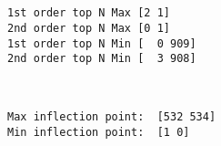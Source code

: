 \documentclass[11pt]{article}
\begin{document}
    \begin{center}
    \end{center}
    { \hspace*{\fill} \\}
    
    \begin{center}
    \end{center}
    { \hspace*{\fill} \\}
    
    \begin{Verbatim}[commandchars=\\\{\}]
1st order top N Max [2 1]
2nd order top N Max [0 1]
1st order top N Min [  0 909]
2nd order top N Min [  3 908]

    \end{Verbatim}

    \begin{center}
    \end{center}
    { \hspace*{\fill} \\}
    
    \begin{Verbatim}[commandchars=\\\{\}]
Max inflection point:  [532 534]
Min inflection point:  [1 0]

    \end{Verbatim}

    \begin{center}
    \end{center}
    { \hspace*{\fill} \\}
    
    \begin{center}
    \end{center}
    { \hspace*{\fill} \\}
    
    \begin{center}
    \end{center}
    { \hspace*{\fill} \\}
    
\end{document}
